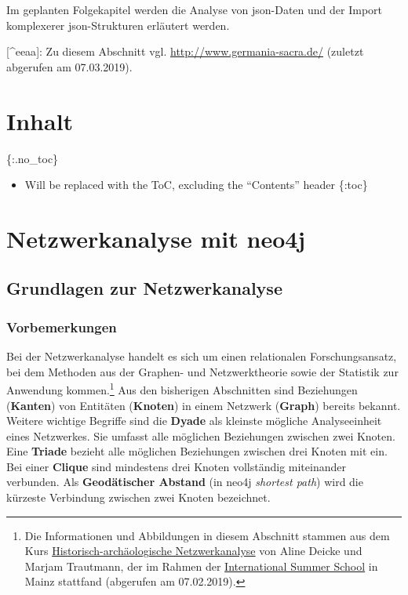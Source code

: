 \documentclass[ngerman,]{scrreprt}
\providecommand{\tightlist}{%
  \setlength{\itemsep}{0pt}\setlength{\parskip}{0pt}}
\begin{document}
Im geplanten Folgekapitel werden die Analyse von json-Daten und der Import komplexerer json-Strukturen erläutert werden.

{[}\^{}eeaa{]}: Zu diesem Abschnitt vgl. \url{http://www.germania-sacra.de/} (zuletzt abgerufen am 07.03.2019).

\chapter{Inhalt}\label{inhalt-9}

\{:.no\_toc\}

\begin{itemize}
\tightlist
\item
  Will be replaced with the ToC, excluding the ``Contents'' header \{:toc\}
\end{itemize}

\chapter{Netzwerkanalyse mit neo4j}\label{netzwerkanalyse-mit-neo4j}

\section{Grundlagen zur Netzwerkanalyse}\label{grundlagen-zur-netzwerkanalyse}

\subsection{Vorbemerkungen}\label{vorbemerkungen}

Bei der Netzwerkanalyse handelt es sich um einen relationalen Forschungsansatz, bei dem Methoden aus der Graphen- und Netzwerktheorie sowie der Statistik zur Anwendung kommen.\footnote{Die Informationen und Abbildungen in diesem Abschnitt stammen aus dem Kurs \href{https://digitale-methodik.adwmainz.net/mod5/5c/slides/networkAnalysis/2018/\#/step-1}{Historisch-archäologische Netzwerkanalyse} von Aline Deicke und Marjam Trautmann, der im Rahmen der \href{https://iss.adwmainz.net}{International Summer School} in Mainz stattfand (abgerufen am 07.02.2019).} Aus den bisherigen Abschnitten sind Beziehungen (\textbf{Kanten}) von Entitäten (\textbf{Knoten}) in einem Netzwerk (\textbf{Graph}) bereits bekannt. Weitere wichtige Begriffe sind die \textbf{Dyade} als kleinste mögliche Analyseeinheit eines Netzwerkes. Sie umfasst alle möglichen Beziehungen zwischen zwei Knoten. Eine \textbf{Triade} bezieht alle möglichen Beziehungen zwischen drei Knoten mit ein. Bei einer \textbf{Clique} sind mindestens drei Knoten vollständig miteinander verbunden. Als \textbf{Geodätischer Abstand} (in neo4j \emph{shortest path}) wird die kürzeste Verbindung zwischen zwei Knoten bezeichnet.
\end{document}

